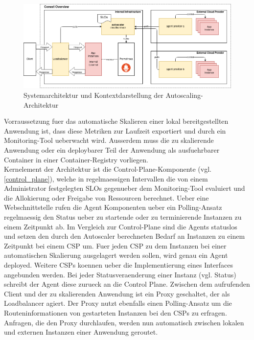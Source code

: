 \documentclass[runningheads]{llncs}
\begin{document}
\begin{figure}[h]
	\centering
	\includegraphics[width=1.0\linewidth,scale=1.0]{images/context.png}
	\caption{Systemarchitektur und Kontextdarstellung der Autoscaling-Architektur}
	\label{systemarchitektur}
\end{figure}

Vorraussetzung fuer das automatische Skalieren einer lokal bereitgestellten Anwendung ist, dass diese Metriken zur Laufzeit exportiert und durch ein Monitoring-Tool ueberwacht wird. Ausserdem muss die zu skalierende Anwendung oder ein deploybarer Teil der Anwendung als ausfuehrbarer Container in einer Container-Registry vorliegen. \\

Kernelement der Architektur ist die Control-Plane-Komponente (vgl. \ref{control_plane}), welche in regelmaessigen Intervallen die von einem Administrator festgelegten SLOs gegenueber dem Monitoring-Tool evaluiert und die Allokierung oder Freigabe von Ressourcen berechnet. Ueber eine Webschnittstelle rufen die Agent Komponenten ueber ein Polling-Ansatz regelmaessig den Status ueber zu startende oder zu terminierende Instanzen zu einem Zeitpunkt ab. Im Vergleich zur Control-Plane sind die Agents statuslos und setzen den durch den Autoscaler berechneten Bedarf an Instanzen zu einem Zeitpunkt bei einem CSP um. Fuer jeden CSP zu dem Instanzen bei einer automatischen Skalierung ausgelagert werden sollen, wird genau ein Agent deployed. Weitere CSPs koennen ueber die Implementierung eines Interfaces angebunden werden. Bei jeder Statusveraenderung einer Instanz (vgl. Status) schreibt der Agent diese zurueck an die Control Plane. Zwischen dem aufrufenden Client und der zu skalierenden Anwendung ist ein Proxy geschaltet, der als Loadbalancer agiert. Der Proxy nutzt ebenfalls einen Polling-Ansatz um die Routeninformationen von gestarteten Instanzen bei den CSPs zu erfragen. Anfragen, die den Proxy durchlaufen, werden nun automatisch zwischen lokalen und externen Instanzen einer Anwendung geroutet.
\end{document}
